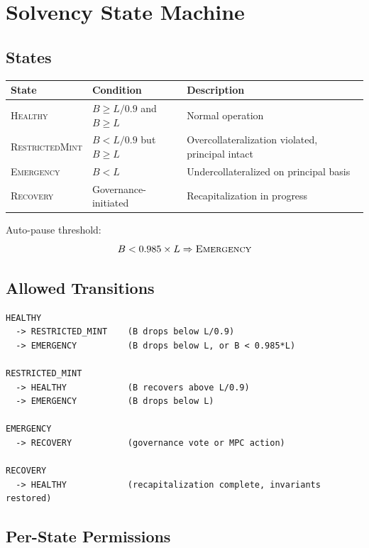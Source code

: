 \documentclass[11pt,a4paper]{article}
\begin{document}
\section{Solvency State Machine}

\subsection{States}

\begin{center}
\begin{tabular}{llp{7cm}}
\toprule
\textbf{State} & \textbf{Condition} & \textbf{Description} \\
\midrule
\textsc{Healthy} & $B \geq L / 0.9$ and $B \geq L$ & Normal operation \\
\textsc{RestrictedMint} & $B < L / 0.9$ but $B \geq L$ & Overcollateralization violated, principal intact \\
\textsc{Emergency} & $B < L$ & Undercollateralized on principal basis \\
\textsc{Recovery} & Governance-initiated & Recapitalization in progress \\
\bottomrule
\end{tabular}
\end{center}

Auto-pause threshold:
$$B < 0.985 \times L \Rightarrow \textsc{Emergency}$$

\subsection{Allowed Transitions}

\begin{verbatim}
HEALTHY
  -> RESTRICTED_MINT    (B drops below L/0.9)
  -> EMERGENCY          (B drops below L, or B < 0.985*L)

RESTRICTED_MINT
  -> HEALTHY            (B recovers above L/0.9)
  -> EMERGENCY          (B drops below L)

EMERGENCY
  -> RECOVERY           (governance vote or MPC action)

RECOVERY
  -> HEALTHY            (recapitalization complete, invariants restored)
\end{verbatim}

\subsection{Per-State Permissions}
\end{document}
